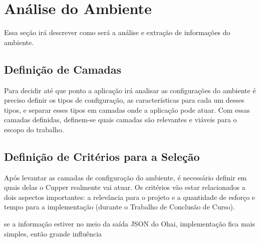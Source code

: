 \section{Análise do Ambiente}
Essa seção irá descrever como será a análise e extração de informações do ambiente. 


\subsection{Definição de Camadas}
Para decidir até que ponto a aplicação irá analisar as configurações
do ambiente é preciso definir os tipos de configuração, as características para
cada um desses tipos, e separar esses tipos em camadas onde a aplicação pode atuar.
Com essas camadas definidas, definem-se quais camadas são relevantes e viáveis
para o escopo do trabalho.

\subsection{Definição de Critérios para a Seleção}
\label{sec:defcritcamada}
Após levantar as camadas de configuração do ambiente, é necessário definir em
quais delas o Cupper realmente vai atuar. Os critérios vão estar relacionados a dois
aspectos importantes: a relevância para o projeto e a quantidade de esforço e tempo
para a implementação (durante o Trabalho de Conclusão de Curso).

{\color{red} se a informação estiver no meio da saída JSON do Ohai, implementação fica mais
simples, então grande influência}


